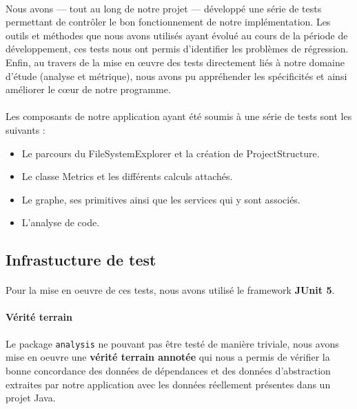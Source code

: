 \documentclass{scrartcl}
\begin{document}
    \paragraph{}Nous avons — tout au long de notre projet — développé une série de tests permettant de contrôler le bon fonctionnement de notre implémentation. Les outils et méthodes que nous avons utilisés ayant évolué au cours de la période de développement, ces tests nous ont permis d'identifier les problèmes de régression. Enfin, au travers de la mise en œuvre des tests directement liés à notre domaine d’étude (analyse et métrique), nous avons pu appréhender les spécificités et ainsi améliorer le cœur de notre programme.
    
    \paragraph{}Les composants de notre application ayant été soumis à une série de tests sont les suivants : 
    \begin{itemize}
        \item Le parcours du FileSystemExplorer et la création de ProjectStructure.
        \item Le classe Metrics et les différents calculs attachés.
        \item Le graphe, ses primitives ainsi que les services qui y sont associés.
        \item L’analyse de code.
    \end{itemize}

\subsection{Infrastucture de test}

    \paragraph{}Pour la mise en oeuvre de ces tests, nous avons utilisé le framework \textbf{JUnit 5}.
    
    \paragraph{Vérité terrain}Le package \texttt{analysis} ne pouvant pas être testé de manière triviale, nous avons mise en oeuvre une \textbf{vérité terrain annotée} qui nous a permis de vérifier la bonne concordance des données de dépendances et des données d’abstraction extraites par notre application avec les données réellement présentes dans un projet Java.
    
\end{document}
